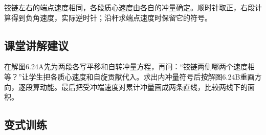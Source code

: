 \documentclass[UTF8,fontset=fandol,a4paper,11pt]{ctexart}
\begin{document}
铰链左右的端点速度相同，各段质心速度由各自的冲量确定。顺时针取正，右段计算得到负角速度，实际逆时针；沿杆求端点速度时保留它的符号。



\subsection*{课堂讲解建议}

在解图6.24A先为两段各写平移和自转冲量方程，再问：“铰链两侧哪两个速度相等？”让学生把各质心速度和自旋贡献代入。求出内冲量符号后按解图6.24B重画方向，逐段算动能。最后把受冲端速度对累计冲量画成两条直线，比较两线下的面积。




\subsection*{变式训练}
\end{document}
